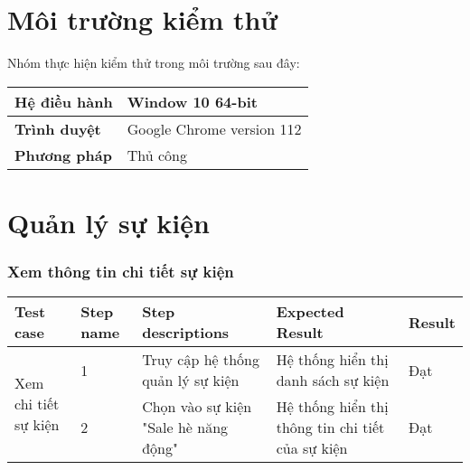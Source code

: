\section{Môi trường kiểm thử}

\hspace*{0.5cm}Nhóm thực hiện kiểm thử trong môi trường sau đây:
\\
{
    \setlength\extrarowheight{6pt}
    \begin{longtable}{| p{} | p{} |}
        \hline
        \textbf{Hệ điều hành} & Window 10 64-bit \\
        \hline
        \textbf{Trình duyệt} & Google Chrome version 112\\
        \hline
        \textbf{Phương pháp} & Thủ công\\
         \hline
    \end{longtable} 
}


\section{Quản lý sự kiện}

\subsubsection{Xem thông tin chi tiết sự kiện}
{
    \setlength\extrarowheight{6pt}
    \begin{longtable}{| p{2.5cm}| p{1cm}| p{5.5cm}| p{4.5cm} | p{1.5cm} |}
        \hline
        \textbf{Test case} & \textbf{Step name} & \textbf{Step descriptions} & \textbf{Expected Result} & \textbf{Result} \\
        \hline
        \multirow[c]{2}{2.5cm}{Xem chi tiết sự kiện} & 1 & Truy cập hệ thống quản lý sự kiện & Hệ thống hiển thị danh sách sự kiện & Đạt \\
        \cline{2-5}
         & 2 & Chọn vào sự kiện "Sale hè năng động" & Hệ thống hiển thị thông tin chi tiết của sự kiện & Đạt \\
         \hline
    \end{longtable}
}

